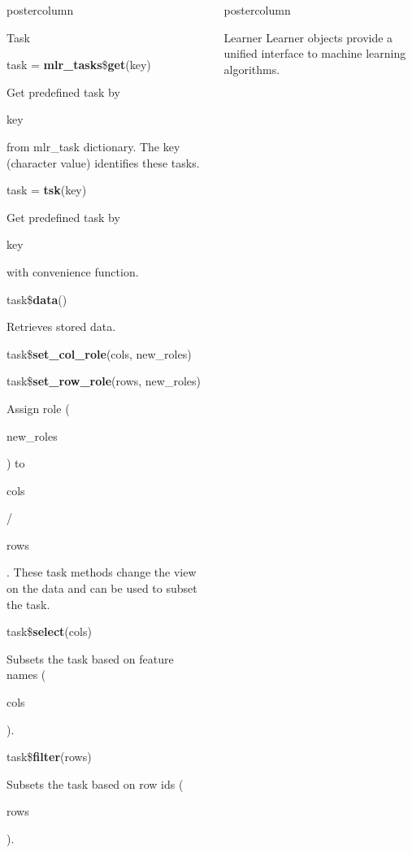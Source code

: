 \documentclass{beamer}
\newlength{\columnheight} %
\newcommand{\codeinline}[1]{\begin{codeboxinline}#1\end{codeboxinline}}
\begin{document}
\begin{frame}[fragile]{}
\begin{columns}
\begin{column}{.245\textwidth}
\begin{beamercolorbox}[center]{postercolumn}
\begin{minipage}{.98\textwidth}
{\begin{myblock}{Task}
							\begin{codebox}
								task = \textbf{mlr\_tasks}\$\textbf{get}(key)
							\end{codebox}
							Get predefined task by \codeinline{key} from mlr\_task dictionary. The key (character value) identifies these tasks.
							\\
							\begin{codebox}
								task = \textbf{tsk}(key)
							\end{codebox}
							Get predefined task by \codeinline{key} with convenience function.
							\\
							\begin{codebox}
								task\$\textbf{data}()
							\end{codebox}
							Retrieves stored data.
							\\
							\begin{codebox}
								task\$\textbf{set\_col\_role}(cols, new\_roles)
							\end{codebox}
							\begin{codebox}
								task\$\textbf{set\_row\_role}(rows, new\_roles)
							\end{codebox}
							Assign role (\codeinline{new\_roles}) to \codeinline{cols} / \codeinline{rows}. These task methods change the view on the data and can be used to subset the task.
							\\
							\begin{codebox}
								task\$\textbf{select}(cols)
							\end{codebox}
							Subsets the task based on feature names (\codeinline{cols}).
							\\
							\begin{codebox}
								task\$\textbf{filter}(rows)
							\end{codebox}
							Subsets the task based on row ids (\codeinline{rows}).
						\end{myblock}
						\vfill
					}
				\end{minipage}
			\end{beamercolorbox}
		\end{column}
		\begin{column}{.245\textwidth}
			\begin{beamercolorbox}[center]{postercolumn}
				\begin{minipage}{.98\textwidth}
					\parbox[t][\columnheight]{\textwidth}{
						\begin{myblock}{Learner}
							Learner objects provide a unified interface to machine learning algorithms.

\end{myblock}}
\end{minipage}
\end{beamercolorbox}
\end{column}
\end{columns}
\end{frame}
\end{document}
